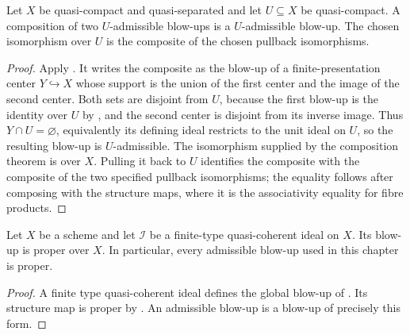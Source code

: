 \begin{lemma}
  \label{lemma:nagata-admissible-blowup-comp}

  Let $X$ be quasi-compact and quasi-separated and let $U\subseteq X$ be
  quasi-compact.  A composition of two $U$-admissible blow-ups is a
  $U$-admissible blow-up.  The chosen isomorphism over $U$ is the composite of
  the chosen pullback isomorphisms.
\end{lemma}

\begin{proof}
  Apply .  It writes the composite as
  the blow-up of a finite-presentation center $Y\hookrightarrow X$ whose
  support is the union of the first center and the image of the second center.
  Both sets are disjoint from $U$, because the first blow-up is the identity
  over $U$ by , and the second
  center is disjoint from its inverse image.  Thus $Y\cap U=\varnothing$,
  equivalently its defining ideal restricts to the unit ideal on $U$, so the
  resulting blow-up is $U$-admissible.  The isomorphism supplied by the
  composition theorem is over $X$.  Pulling it back to $U$ identifies the
  composite with the composite of the two specified pullback isomorphisms;
  the equality follows after composing with the structure maps, where it is
  the associativity equality for fibre products.
\end{proof}

\begin{lemma}
  \label{lemma:nagata-blowup-proper}

  Let $X$ be a scheme and let $\mathcal I$ be a finite-type quasi-coherent
  ideal on $X$.  Its blow-up is proper over $X$.  In particular,
  every admissible blow-up used in this chapter is proper.
\end{lemma}

\begin{proof}
  A finite type quasi-coherent ideal defines the global blow-up of
  .  Its structure map is proper by
  .  An admissible blow-up is a blow-up
  of precisely this form.
\end{proof}

